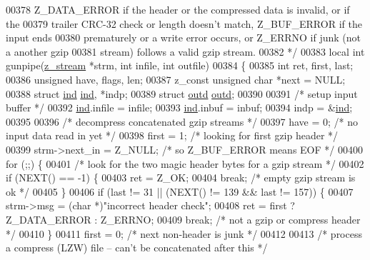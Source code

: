 \begin{DoxyCode}
00378 \textcolor{comment}{   Z\_DATA\_ERROR if the header or the compressed data is invalid, or if the}
00379 \textcolor{comment}{   trailer CRC-32 check or length doesn't match, Z\_BUF\_ERROR if the input ends}
00380 \textcolor{comment}{   prematurely or a write error occurs, or Z\_ERRNO if junk (not a another gzip}
00381 \textcolor{comment}{   stream) follows a valid gzip stream.}
00382 \textcolor{comment}{ */}
00383 local \textcolor{keywordtype}{int} gunpipe(\hyperlink{structz__stream__s}{z\_stream} *strm, \textcolor{keywordtype}{int} infile, \textcolor{keywordtype}{int} outfile)
00384 \{
00385     \textcolor{keywordtype}{int} ret, first, last;
00386     \textcolor{keywordtype}{unsigned} have, flags, len;
00387     z\_const \textcolor{keywordtype}{unsigned} \textcolor{keywordtype}{char} *next = NULL;
00388     \textcolor{keyword}{struct }\hyperlink{structind}{ind} \hyperlink{structind}{ind}, *indp;
00389     \textcolor{keyword}{struct }\hyperlink{structoutd}{outd} \hyperlink{structoutd}{outd};
00390 
00391     \textcolor{comment}{/* setup input buffer */}
00392     \hyperlink{structind}{ind}.infile = infile;
00393     \hyperlink{structind}{ind}.inbuf = inbuf;
00394     indp = &\hyperlink{structind}{ind};
00395 
00396     \textcolor{comment}{/* decompress concatenated gzip streams */}
00397     have = 0;                               \textcolor{comment}{/* no input data read in yet */}
00398     first = 1;                              \textcolor{comment}{/* looking for first gzip header */}
00399     strm->next\_in = Z\_NULL;                 \textcolor{comment}{/* so Z\_BUF\_ERROR means EOF */}
00400     \textcolor{keywordflow}{for} (;;) \{
00401         \textcolor{comment}{/* look for the two magic header bytes for a gzip stream */}
00402         \textcolor{keywordflow}{if} (NEXT() == -1) \{
00403             ret = Z\_OK;
00404             \textcolor{keywordflow}{break};                          \textcolor{comment}{/* empty gzip stream is ok */}
00405         \}
00406         \textcolor{keywordflow}{if} (last != 31 || (NEXT() != 139 && last != 157)) \{
00407             strm->msg = (\textcolor{keywordtype}{char} *)\textcolor{stringliteral}{"incorrect header check"};
00408             ret = first ? Z\_DATA\_ERROR : Z\_ERRNO;
00409             \textcolor{keywordflow}{break};                          \textcolor{comment}{/* not a gzip or compress header */}
00410         \}
00411         first = 0;                          \textcolor{comment}{/* next non-header is junk */}
00412 
00413         \textcolor{comment}{/* process a compress (LZW) file -- can't be concatenated after this */}

\end{DoxyCode}
